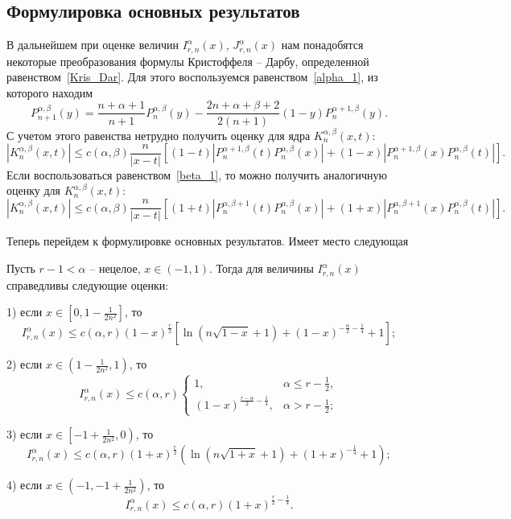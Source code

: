 \subsection{Формулировка основных результатов}

В дальнейшем при оценке величин $I_{r,n}^\alpha(x)$, $J_{r,n}^\alpha(x)$ нам понадобятся некоторые преобразования формулы Кристоффеля -- Дарбу, определенной равенством~\eqref{Kris_Dar}. Для этого воспользуемся равенством~\eqref{alpha_1}, из которого находим
$$
P_{n+1}^{\alpha,\beta}(y)=\frac{n+\alpha+1}{n+1}P_{n}^{\alpha,\beta}(y)-\frac{2n+\alpha+\beta+2}{2(n+1)}(1-y)P_{n}^{\alpha+1,\beta}(y).
$$
С учетом этого равенства нетрудно получить оценку для ядра $K_n^{\alpha,\beta}(x,t)$:
$$
|K_n^{\alpha,\beta}(x,t)|\le
c(\alpha,\beta)\frac{n}{|x-t|}\left[(1-t)|P_{n}^{\alpha+1,\beta}(t)P_{n}^{\alpha,\beta}(x)|+
(1-x)|P_{n}^{\alpha+1,\beta}(x)P_{n}^{\alpha,\beta}(t)|\right].
$$
Если воспользоваться равенством~\eqref{beta_1}, то можно получить аналогичную оценку для \linebreak$K_n^{\alpha,\beta}(x,t)$:
$$
|K_n^{\alpha,\beta}(x,t)|\le
c(\alpha,\beta)\frac{n}{|x-t|}\left[(1+t)|P_{n}^{\alpha,\beta+1}(t)P_{n}^{\alpha,\beta}(x)|+
(1+x)|P_{n}^{\alpha,\beta+1}(x)P_{n}^{\alpha,\beta}(t)|\right].
$$

Теперь перейдем к формулировке основных результатов. Имеет место следующая
\begin{theorem}\label{Ram-theo1}
	Пусть $r-1<\alpha$ -- нецелое, $x\in(-1,1)$. Тогда для величины $I_{r,n}^\alpha(x)$ справедливы следующие оценки:
	
	1) если $x\in\left[0,1-\frac{1}{2n^2}\right]$, то
	\begin{equation*}
		I_{r,n}^\alpha(x)\le c(\alpha,r)(1-x)^{\frac{r}{2}}\left[\ln(n\sqrt{1-x}+1)+(1-x)^{-\frac{\alpha}{2}-\frac14}+1\right];
	\end{equation*}
	
	2) если $x\in\left(1-\frac{1}{2n^2},1\right)$, то
	\begin{equation*}
		I_{r,n}^\alpha(x)\le c(\alpha,r)
		\begin{cases}
			1, & \alpha\le r-\frac12, \\
			(1-x)^{\frac{r-\alpha}{2}-\frac14}, & \alpha>r-\frac12;
		\end{cases}
	\end{equation*}
	
	3) если $x\in\left[-1+\frac{1}{2n^2},0\right)$, то
	\begin{equation*}
		I_{r,n}^\alpha(x)\le c(\alpha,r)(1+x)^{\frac{r}{2}}\left(\ln(n\sqrt{1+x}+1)+(1+x)^{-\frac14}+1\right);
	\end{equation*}
	
	4) если $x\in\left(-1,-1+\frac{1}{2n^2}\right)$, то
	\begin{equation*}
		I_{r,n}^\alpha(x)\le c(\alpha,r)(1+x)^{\frac{r}{2}-\frac14}.
	\end{equation*}
\end{theorem}

